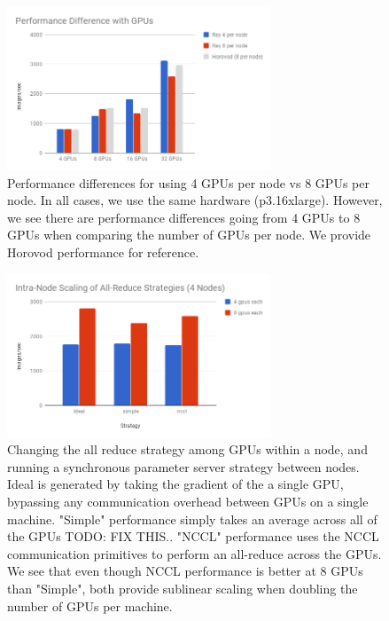 \begin{figure}
    \centering
    \includegraphics[width=3.1in,keepaspectratio]{fig/4to8.png}
    \caption{
    \small{
        Performance differences for using 4 GPUs per node vs 8 GPUs per node. In all cases, we use the same hardware (p3.16xlarge). However, we see there are performance differences going from 4 GPUs to 8 GPUs when comparing the number of GPUs per node. We provide Horovod performance for reference.
    }
    }
    \label{fig:8-vs-4-gpu}
\end{figure}

\begin{figure}
    \centering
    \includegraphics[width=3.1in,keepaspectratio]{fig/intranode.png}
    \caption{
    \small{
        Changing the all reduce strategy among GPUs within a node, and running a synchronous parameter server strategy between nodes. Ideal is generated by taking the gradient of the a single GPU, bypassing any communication overhead between GPUs on a single machine. "Simple" performance simply takes an average across all of the GPUs {\color{red} TODO: FIX THIS.}. "NCCL" performance uses the NCCL communication primitives to perform an all-reduce across the GPUs. We see that even though NCCL performance is better at 8 GPUs than "Simple", both provide sublinear scaling when doubling the number of GPUs per machine.
    }
    }
    \label{fig:intra-node-allreduce-strategy}
\end{figure}
